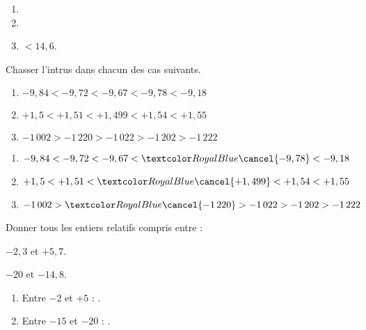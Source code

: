 \begin{Maquette}[Fiche,CorrigeFin,Colonnes=2]{}
\begin{multicols}{2}
      \begin{Solution}
         {\baselineskip=7mm
         \begin{enumerate}
            \item {}
            \item {}
            \item {}
            \hfill $<14,6$.
         \end{enumerate}}  
      \end{Solution}
      
      
      \begin{exercice}[Dur] %
         Chasser l'intrus dans chacun des cas suivants.
         {\baselineskip=7mm
         \begin{enumerate}
            \item $-9,84 < -9,72 < -9,67 < -9,78 < -9,18$
            \item $+1,5 < +1,51 < +1,499 < +1,54 < +1,55$
            \item $-1\,002 > -1\,220 > -1\,022 > -1\,202 > -1\,222$
         \end{enumerate}}
      \end{exercice}

      \begin{Solution}
         {\baselineskip=7mm
         \begin{enumerate}
            \item $-9,84 < -9,72 < -9,67 < \cor{\cancel{-9,78}} < -9,18$ 
            \item $+1,5 < +1,51 < \cor{\cancel{+1,499}} < +1,54 < +1,55$ 
            \item $-1\,002 > \cor{\cancel{-1\,220}} > -1\,022 > -1\,202 > -1\,222$
         \end{enumerate}}
      \end{Solution}
      
      
      \begin{exercice}  %
         Donner tous les entiers relatifs compris entre :
         \begin{colenumerate}
            \item $-2,3$ et $+5,7$.
            \item $-20$ et $-14,8$.
         \end{colenumerate}
      \end{exercice}
      
      \begin{Solution}
         \begin{enumerate}
            \item Entre $-2$ et $+5$ : .
            \item Entre $-15$ et $-20$ : .
         \end{enumerate}
      \end{Solution}
               

\end{multicols}
\end{Maquette}
